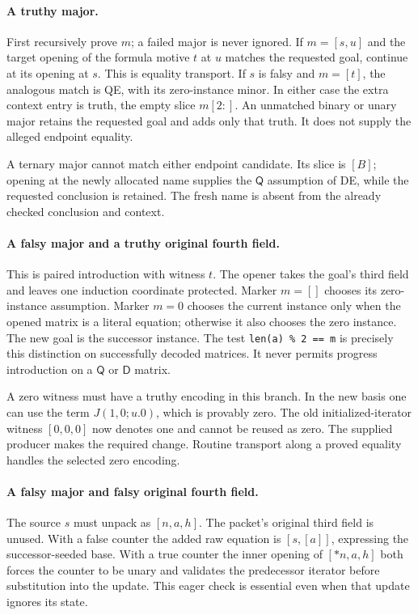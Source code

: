 \documentclass[11pt,letterpaper]{article}
\theoremstyle{definition}\newtheorem{definition}[theorem]{Definition}
\theoremstyle{remark}\newtheorem{remark}[theorem]{Remark}
\newcommand{\D}{\mathsf D}
\newcommand{\Q}{\mathsf Q}
\begin{document}
\paragraph{A truthy major.}
First recursively prove $m$; a failed major is never ignored. If
$m=[s,u]$ and the target opening of the formula motive $t$ at $u$
matches the requested goal, continue at its opening at $s$. This is
equality transport. If $s$ is falsy and $m=[t]$, the analogous match is
QE, with its zero-instance minor. In either case the extra context entry
is truth, the empty slice $m[2:]$. An unmatched binary or unary major
retains the requested goal and adds only that truth. It does not supply
the alleged endpoint equality.

A ternary major cannot match either endpoint candidate. Its slice is
$[B]$; opening at the newly allocated name supplies the $\Q$ assumption
of DE, while the requested conclusion is retained. The fresh name is
absent from the already checked conclusion and context.

\paragraph{A falsy major and a truthy original fourth field.}
This is paired introduction with witness $t$. The opener takes the goal's
third field and leaves one induction coordinate protected. Marker $m=[]$
chooses its zero-instance assumption. Marker $m=0$ chooses the current
instance only when the opened matrix is a literal equation; otherwise
it also chooses the zero instance. The new goal is the successor
instance. The test \texttt{len(a) \% 2 == m} is precisely this distinction
on successfully decoded matrices. It never permits progress introduction
on a $\Q$ or $\D$ matrix.

A zero witness must have a truthy encoding in this branch. In the new
basis one can use the term $J(1,0;u.0)$, which is provably zero. The old
initialized-iterator witness $[0,0,0]$ now denotes one and cannot be reused
as zero. The supplied producer makes the required change. Routine
transport along a proved equality handles the selected zero encoding.

\paragraph{A falsy major and falsy original fourth field.}
The source $s$ must unpack as $[n,a,h]$. The packet's original third
field is unused. With a false counter the added raw equation is
$[s,[a]]$, expressing the successor-seeded base. With a true counter
the inner opening of $[*n,a,h]$ both forces the counter to be unary and
validates the predecessor iterator before substitution into the update.
This eager check is essential even when that update ignores its state.
\end{document}
